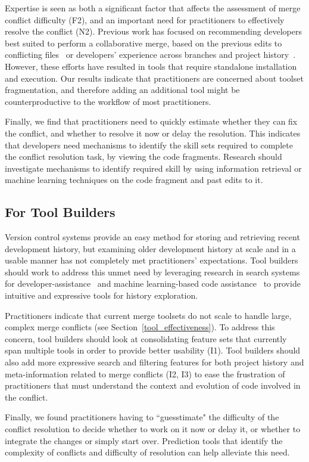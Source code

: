 Expertise is seen as both a significant factor that affects the assessment of merge conflict difficulty (F2), and an important need for practitioners to effectively resolve the conflict (N2).
Previous work has focused on recommending developers best suited to perform a collaborative merge, based on the previous edits to conflicting files~\cite{dasilva2015niche} or developers' experience across branches and project history~\cite{CostaSarma}. However, these efforts have resulted in tools that require standalone installation and execution. Our results indicate that practitioners are concerned about toolset fragmentation, and therefore adding an additional tool might be counterproductive to the workflow of most practitioners. 

Finally, we find that practitioners need to quickly estimate whether they can fix the conflict, and whether to resolve it now or delay the resolution. This indicates that developers need mechanisms to identify the skill sets required to complete the conflict resolution task, by viewing the code fragments. Research should investigate mechanisms to identify required skill by using information retrieval or machine learning techniques on the code fragment and past edits to it. 

\subsection{For Tool Builders}
Version control systems provide an easy method for storing and retrieving recent development history, but examining older development history at scale and in a usable manner has not completely met practitioners' expectations.
Tool builders should work to address this unmet need by leveraging research in search systems for developer-assistance~\cite{nabi2016putting} and machine learning-based code assistance~\cite{bradley2011history_exploration} to provide intuitive and expressive tools for history exploration.

Practitioners indicate that current merge toolsets do not scale to handle large, complex merge conflicts (see Section~\ref{tool_effectiveness}).
To address this concern, tool builders should look at consolidating feature sets that currently span multiple tools in order to provide better usability (I1).
Tool builders should also add more expressive search and filtering features for both project history and meta-information related to merge conflicts (I2, I3) to ease the frustration of practitioners that must understand the context and evolution of code involved in the conflict.

Finally, we found practitioners having to ``guesstimate" the difficulty of the conflict resolution to decide whether to work on it now or delay it, or whether to integrate the changes or simply start over. Prediction tools that identify the complexity of conflicts and difficulty of resolution can help alleviate this need.